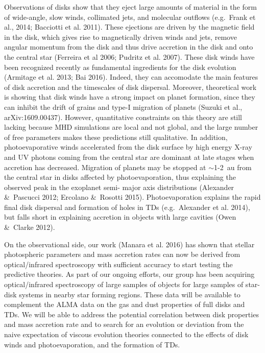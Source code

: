 \documentclass[10pt,fleqn,twoside]{article}
\begin{document}
Observations of disks show that they eject large amounts of material in the form of wide-angle, 
slow winds, collimated jets, and molecular outflows (e.g.\ Frank et al., 2014; 
Bacciotti et al. 2011). These ejections are driven by the magnetic field in the disk, which gives 
rise to magnetically driven winds and jets, remove angular momentum from the disk and thus 
drive accretion in the disk and onto the central star (Ferreira et al 2006; Pudritz et al. 2007). 
These disk winds have been recognized recently as fundamental ingredients for the disk 
evolution (Armitage et al. 2013; Bai 2016). Indeed, they can accomodate the main features 
of disk 
accretion and the timescales of disk dispersal. Moreover, theoretical work is showing that 
disk winds have a strong impact on planet formation, since they can inhibit the drift of 
grains and type-I migration of planets (Suzuki et al., arXiv:1609.00437). However, 
quantitative constraints on this theory are still lacking because MHD simulations are 
local and not global, and the large number of free parameters makes these predictions 
still qualitative. In addition, photoevaporative winds accelerated from the disk surface 
by high energy X-ray and UV photons coming from the central star are dominant at late 
stages when accretion has decreased. Migration of planets may be stopped at $\sim$1-2~au 
from the central star in disks affected by photoevaporation, thus explaining the observed 
peak in the exoplanet semi- major axis distributions (Alexander \&\ Pascucci 2012; 
Ercolano \&\ Rosotti 2015). Photoevaporation explains the rapid final disk dispersal 
and formation of holes in TDs (e.g.\ Alexander et al. 2014), but falls short in explaining 
accretion in objects with large cavities (Owen \&\ Clarke 2012).

On the observational side, our work (Manara et al. 2016) has shown that stellar photospheric parameters and mass accretion rates can now be derived from optical/infrared spectroscopy with sufficient 
accuracy to start testing the predictive theories. As part of our ongoing efforts, our group has 
been acquiring optical/infrared spectroscopy of large samples of objects for large samples of 
star-disk systems in nearby star forming regions. These data will be available to complement the 
ALMA data on the gas and dust properties of full disks and TDs. We will be able to address the 
potential correlation between disk properties and mass accretion rate and to search for an 
evolution or deviation from the naive expectation of viscous evolution theories connected to the 
effects of disk winds and photoevaporation, and the formation of TDs.
\end{document}
